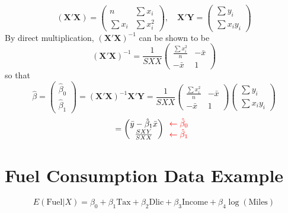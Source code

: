 \documentclass[14pt]{extarticle}
\begin{document}
\[
(\textbf{X}'\textbf{X}) = \begin{pmatrix}
n & \sum x_i \\
\sum x_i & \sum x_i^2
\end{pmatrix}, \quad
\textbf{X}'\textbf{Y} = \begin{pmatrix}
\sum y_i \\
\sum x_i y_i
\end{pmatrix}
\]
By direct multiplication, $(\textbf{X}'\textbf{X})^{-1}$ can be shown to be
\[
(\textbf{X}'\textbf{X})^{-1} = \frac{1}{SXX} 
\begin{pmatrix}
\frac{\sum x_i^2}{n} & -\bar{x} \\
-\bar{x} & 1
\end{pmatrix}
\]
so that
\[
\hat{\beta} = 
\begin{pmatrix}
\hat{\beta}_0 \\
\hat{\beta}_1
\end{pmatrix} 
= (\textbf{X}'\textbf{X})^{-1}\textbf{X}'\textbf{Y}
= \frac{1}{SXX} 
\begin{pmatrix}
\frac{\sum x_i^2}{n} & -\bar{x} \\
-\bar{x} & 1
\end{pmatrix}
\begin{pmatrix}
\sum y_i \\
\sum x_i y_i
\end{pmatrix}
\]
\[
= \begin{pmatrix}
\bar{y} - \hat{\beta}_1 \bar{x} \\
\frac{SXY}{SXX}
\end{pmatrix}
\textcolor{red}{
\begin{array}{l}
\leftarrow \hat{\beta}_0 \\
\leftarrow \hat{\beta}_1
\end{array}}
\]

\newpage
\section*{Fuel Consumption Data Example}

\[
E(\text{Fuel}|X) = \beta_0 + \beta_1 \text{Tax} + \beta_2 \text{Dlic} 
+ \beta_3 \text{Income} + \beta_4 \log(\text{Miles})
\]
\end{document}
